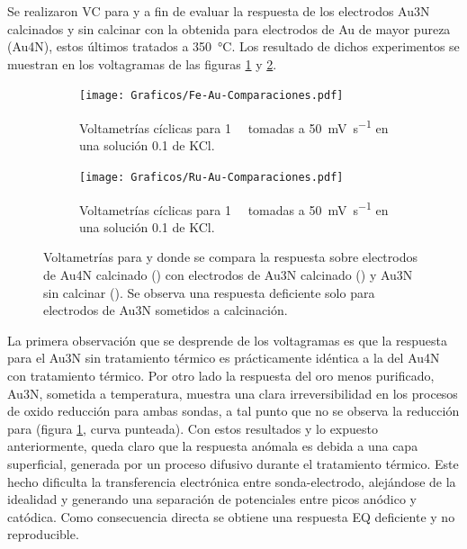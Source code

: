 {			Se realizaron VC para \ru\space y \fe\space a fin de evaluar la respuesta de los electrodos Au3N calcinados y sin calcinar con la obtenida para electrodos de Au de mayor pureza (Au4N), estos últimos tratados a \SI{350}{\celsius}. Los resultado de dichos experimentos se muestran en los voltagramas de las figuras \ref{fig:Fe-Au-compa} y \ref{fig:Ru-Au-compa}.

				\begin{figure}[ht]
		 	      \begin{subfigure}[t]{0.495\textwidth}
		          	\texttt{[image: Graficos/Fe-Au-Comparaciones.pdf]}
		         	\caption{Voltametrías cíclicas para \fe\space \SI{1}{\milli\Molar} tomadas a \SI{50}{\milli\volt\per\second} en una solución \SI{0.1}{\Molar} de KCl.}
		          	\label{fig:Fe-Au-compa}
		      		\end{subfigure}
		      	 \begin{subfigure}[t]{0.495\textwidth}
		          	\texttt{[image: Graficos/Ru-Au-Comparaciones.pdf]}
		         	\caption{Voltametrías cíclicas para \ru\space \SI{1}{\milli\Molar} tomadas a \SI{50}{\milli\volt\per\second} en una solución \SI{0.1}{\Molar} de KCl.}
		          	\label{fig:Ru-Au-compa}
		      		\end{subfigure}
		      	 \caption[Comparación entre electrodos calcinados y sin calcinar]{Voltametrías para \ferroferri\space y \aminorutenio\space donde se compara la respuesta sobre electrodos de Au4N calcinado (\usebox{\negro}) con electrodos de Au3N calcinado (\usebox{\punteado}) y Au3N sin calcinar (\usebox{\rojo}). Se observa una respuesta deficiente solo para electrodos de Au3N sometidos a calcinación.}
		      	 \label{Fig:Comparacion-Au}
	      		 \end{figure}	

			La primera observación que se desprende de los voltagramas es que la respuesta para el Au3N sin tratamiento térmico es prácticamente idéntica a la del Au4N con tratamiento térmico. Por otro lado la respuesta del oro menos purificado, Au3N, sometida a temperatura, muestra una clara irreversibilidad en los procesos de oxido reducción para ambas sondas, a tal punto que no se observa la reducción para \ferroferri\space (figura \ref{fig:Fe-Au-compa}, curva punteada). Con estos resultados y lo expuesto anteriormente, queda claro que la respuesta anómala es debida a una capa superficial, generada por un proceso difusivo durante el tratamiento térmico. Este hecho dificulta la transferencia electrónica entre sonda-electrodo, alejándose de la idealidad y generando una separación de potenciales entre picos anódico y catódica. Como consecuencia directa se obtiene una respuesta EQ deficiente y no reproducible.  

}
